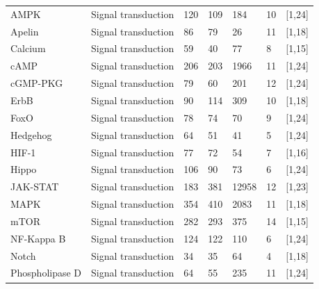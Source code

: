 \begin{table}[H]
\begin{adjustbox}{center}
\begin{tabular}{|l|l|l|l|l|l|l|}
AMPK                    & Signal transduction         & 120  & 109 & 184   & 10 & {[}1,24{]}  \\
Apelin                  & Signal transduction         & 86   & 79  & 26    & 11 & {[}1,18{]}  \\   
Calcium                 & Signal transduction         & 59   & 40  & 77    & 8  & {[}1,15{]}  \\    
cAMP                    & Signal transduction         & 206  & 203 & 1966  & 11 & {[}1,24{]}  \\    
cGMP-PKG                & Signal transduction         & 79   & 60  & 201   & 12 & {[}1,24{]}  \\
ErbB                    & Signal transduction         & 90   & 114 & 309   & 10 & {[}1,18{]}  \\          
FoxO                    & Signal transduction         & 78   & 74  & 70    & 9  & {[}1,24{]}  \\   
Hedgehog                & Signal transduction         & 64   & 51  & 41    & 5  & {[}1,24{]}  \\ 
HIF-1                   & Signal transduction         & 77   & 72  & 54    & 7  & {[}1,16{]}  \\     
Hippo                   & Signal transduction         & 106  & 90  & 73    & 6  & {[}1,24{]}  \\     
JAK-STAT                & Signal transduction         & 183  & 381 & 12958 & 12 & {[}1,23{]}  \\        
MAPK                    & Signal transduction         & 354  & 410 & 2083  & 11 & {[}1,18{]}  \\      
mTOR                    & Signal transduction         & 282  & 293 & 375   & 14 & {[}1,15{]}  \\    
NF-Kappa B              & Signal transduction         & 124  & 122 & 110   & 6  & {[}1,24{]}  \\    
Notch                   & Signal transduction         & 34   & 35  & 64    & 4  & {[}1,18{]}  \\          
Phospholipase D         & Signal transduction         & 64   & 55  & 235   & 11 & {[}1,24{]}  \\\hline   
\end{tabular}
\end{adjustbox}
\end{table}\newpage

